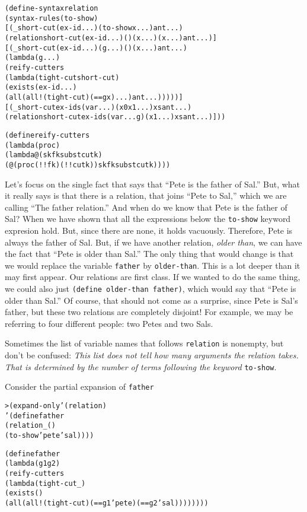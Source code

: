 \begin{alltt}
(define-syntax relation
  (syntax-rules (to-show)
    [(_ short-cut (ex-id ...) (to-show x ...) ant ...)
     (relation short-cut (ex-id ...) () (x ...) (x ...) ant ...)]
    [(_ short-cut (ex-id ...) (g ...) () (x ...) ant ...)
     (lambda (g ...)
       (reify-cutters
         (lambda (tight-cut short-cut)
           (exists (ex-id ...)
             (all (all! (tight-cut) (== g x) ...) ant ...)))))]
    [(_ short-cut ex-ids (var ...) (x0 x1 ...) xs ant ...)
     (relation short-cut ex-ids (var ... g) (x1 ...) xs ant ...)]))

(define reify-cutters
  (lambda (proc)
    (lambda@ (sk fk subst cutk)
      (@ (proc (!! fk) (!! cutk)) sk fk subst cutk))))
\end{alltt}

Let's focus on the single fact that says that ``Pete is the father of
Sal.''  But, what it really says is that there is a relation, that
joins ``Pete to Sal,'' which we are calling ``The father relation.''
And when do we know that Pete is the father of Sal?  When we have
shown that all the expressions below the \texttt{to-show} keyword
expresion hold.  But, since there are none, it holds vacuously.
Therefore, Pete is always the father of Sal.  But, if we have another
relation, \emph{older than}, we can have the fact that ``Pete is older
than Sal.''  The only thing that would change is that we would replace
the variable \texttt{father} by \texttt{older-than}.  This is a lot
deeper than it may first appear.  Our relations are first class.  If
we wanted to do the same thing, we could also just \texttt{(define
older-than father)}, which would say that ``Pete is older than Sal.''
Of course, that should not come as a surprise, since Pete is Sal's
father, but these two relations are completely disjoint!  For example,
we may be referring to four different people: two Petes and two Sals.

Sometimes the list of variable names that follows \texttt{relation} is
nonempty, but don't be confused: \emph{This list does not tell how
many arguments the relation takes. That is determined by the number of
terms following the keyword} \texttt{to-show}.

Consider the partial expansion of \texttt{father}
\begin{alltt}
> (expand-only '(relation)
    '(define father  
       (relation _ ()
         (to-show 'pete 'sal))))
\end{alltt}

\begin{alltt}
(define father
  (lambda (g1 g2)
    (reify-cutters
      (lambda (tight-cut _)
        (exists ()
          (all (all! (tight-cut) (== g1 'pete) (== g2 'sal))))))))
\end{alltt}


